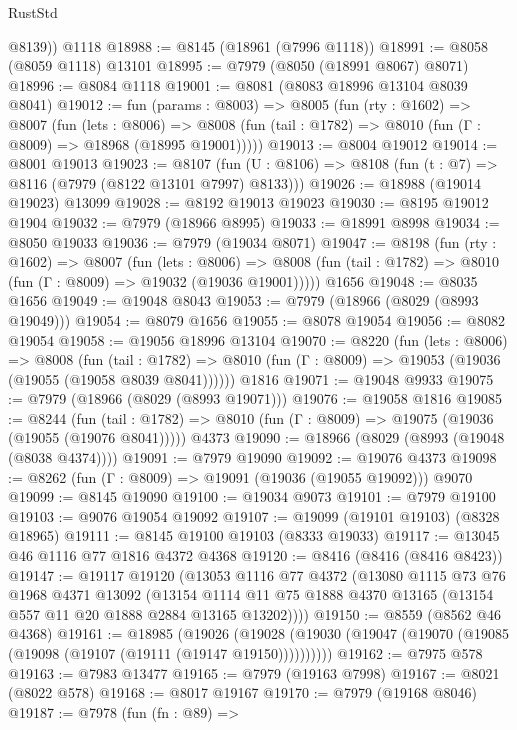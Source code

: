 \begin{lexlean}{RustStd}
\begin{coremodule}
        @8139))
    @1118
@18988 := @8145 (@18961 (@7996 @1118))
@18991 := @8058 (@8059 @1118) @13101
@18995 := @7979 (@8050 (@18991 @8067) @8071)
@18996 := @8084 @1118
@19001 := @8081 (@8083 @18996 @13104 @8039 @8041)
@19012 := fun (params : @8003) =>
  @8005
    (fun (rty : @1602) =>
    @8007
      (fun (lets : @8006) =>
      @8008 (fun (tail : @1782) => @8010 (fun (Γ : @8009) => @18968 (@18995 @19001)))))
@19013 := @8004 @19012
@19014 := @8001 @19013
@19023 := @8107
    (fun (U : @8106) => @8108 (fun (t : @7) => @8116 (@7979 (@8122 @13101 @7997) @8133)))
@19026 := @18988 (@19014 @19023) @13099
@19028 := @8192 @19013 @19023
@19030 := @8195 @19012 @1904
@19032 := @7979 (@18966 @8995)
@19033 := @18991 @8998
@19034 := @8050 @19033
@19036 := @7979 (@19034 @8071)
@19047 := @8198
    (fun (rty : @1602) =>
    @8007
      (fun (lets : @8006) =>
      @8008 (fun (tail : @1782) => @8010 (fun (Γ : @8009) => @19032 (@19036 @19001)))))
    @1656
@19048 := @8035 @1656
@19049 := @19048 @8043
@19053 := @7979 (@18966 (@8029 (@8993 @19049)))
@19054 := @8079 @1656
@19055 := @8078 @19054
@19056 := @8082 @19054
@19058 := @19056 @18996 @13104
@19070 := @8220
    (fun (lets : @8006) =>
    @8008
      (fun (tail : @1782) =>
      @8010 (fun (Γ : @8009) => @19053 (@19036 (@19055 (@19058 @8039 @8041))))))
    @1816
@19071 := @19048 @9933
@19075 := @7979 (@18966 (@8029 (@8993 @19071)))
@19076 := @19058 @1816
@19085 := @8244
    (fun (tail : @1782) => @8010 (fun (Γ : @8009) => @19075 (@19036 (@19055 (@19076 @8041)))))
    @4373
@19090 := @18966 (@8029 (@8993 (@19048 (@8038 @4374))))
@19091 := @7979 @19090
@19092 := @19076 @4373
@19098 := @8262 (fun (Γ : @8009) => @19091 (@19036 (@19055 @19092))) @9070
@19099 := @8145 @19090
@19100 := @19034 @9073
@19101 := @7979 @19100
@19103 := @9076 @19054 @19092
@19107 := @19099 (@19101 @19103) (@8328 @18965)
@19111 := @8145 @19100 @19103 (@8333 @19033)
@19117 := @13045 @46 @1116 @77 @1816 @4372 @4368
@19120 := @8416 (@8416 (@8416 @8423))
@19147 := @19117
    @19120
    (@13053
      @1116
      @77
      @4372
      (@13080
        @1115
        @73
        @76
        @1968
        @4371
        @13092
        (@13154 @1114 @11 @75 @1888 @4370 @13165 (@13154 @557 @11 @20 @1888 @2884 @13165 @13202))))
@19150 := @8559 (@8562 @46 @4368)
@19161 := @18985
    (@19026 (@19028 (@19030 (@19047 (@19070 (@19085 (@19098 (@19107 (@19111 (@19147 @19150))))))))))
@19162 := @7975 @578
@19163 := @7983 @13477
@19165 := @7979 (@19163 @7998)
@19167 := @8021 (@8022 @578)
@19168 := @8017 @19167
@19170 := @7979 (@19168 @8046)
@19187 := @7978
    (fun (fn : @89) =>

\end{coremodule}
\end{lexlean}
